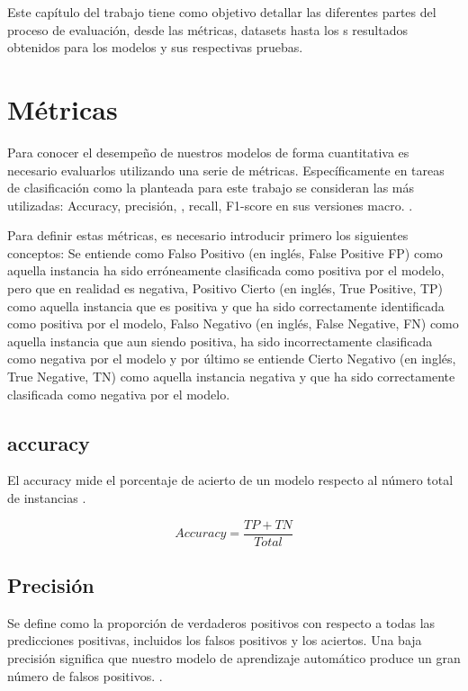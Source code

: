Este capítulo del trabajo tiene como objetivo detallar las diferentes partes del proceso de evaluación, desde las métricas, datasets hasta los s resultados obtenidos para los modelos y sus respectivas pruebas.

\section{Métricas} \label{metricas}
Para conocer el desempeño de nuestros modelos de forma cuantitativa es necesario evaluarlos utilizando una serie de métricas. Específicamente en tareas de clasificación como la planteada para este trabajo se consideran las más utilizadas: Accuracy,  precisión, , recall, F1-score en sus versiones macro. \cite{forman2003extensive}.

Para definir estas métricas, es necesario introducir primero los siguientes conceptos: Se entiende como Falso Positivo (en inglés, False Positive FP) como aquella instancia ha sido erróneamente clasificada como positiva por el modelo, pero que en realidad es negativa, Positivo Cierto (en inglés, True Positive, TP) como aquella instancia que es positiva y que ha sido correctamente identificada como positiva por el modelo, Falso Negativo (en inglés, False Negative, FN) como aquella instancia que aun siendo positiva, ha sido incorrectamente clasificada como negativa por el modelo y por último se entiende Cierto Negativo (en inglés, True Negative, TN) como aquella instancia negativa y que ha sido correctamente clasificada como negativa por el modelo.

\subsection{accuracy}
El accuracy mide el porcentaje de acierto de un modelo respecto al número total de instancias \cite{forman2003extensive}.

\begin{equation}
Accuracy = \frac{TP+TN}{Total}
 \label{Accuracy-Formula}
\end{equation}

\subsection{Precisión}
Se define como la proporción de verdaderos positivos con respecto a todas las predicciones positivas, incluidos los falsos positivos y los aciertos. Una baja precisión significa que nuestro modelo de aprendizaje automático produce un gran número de falsos positivos. \cite{forman2003extensive}. 

